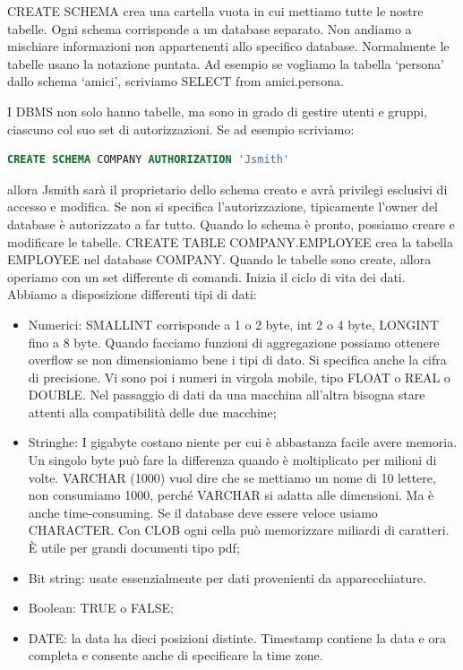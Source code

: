 CREATE SCHEMA crea una cartella vuota in cui mettiamo tutte le nostre tabelle. Ogni schema corrisponde a un database separato. Non andiamo a mischiare informazioni non appartenenti allo specifico database. Normalmente le tabelle usano la notazione puntata. Ad esempio se vogliamo la tabella ‘persona’ dallo schema ‘amici’, scriviamo SELECT from amici.persona.  

I DBMS non solo hanno tabelle, ma sono in grado di gestire utenti e gruppi,  ciascuno col suo set di autorizzazioni. Se ad esempio scriviamo:

\begin{lstlisting}[language=SQL]
CREATE SCHEMA COMPANY AUTHORIZATION 'Jsmith'
\end{lstlisting}

allora Jsmith sarà il proprietario dello schema creato e avrà privilegi esclusivi di accesso e modifica. Se non si specifica l’autorizzazione, tipicamente l’owner del database è autorizzato a far tutto.   
Quando lo schema è pronto, possiamo creare e modificare le tabelle. CREATE TABLE COMPANY.EMPLOYEE crea la tabella EMPLOYEE nel database COMPANY.  Quando le tabelle sono create, allora operiamo con un set differente di comandi. Inizia il ciclo di vita dei dati. Abbiamo a disposizione differenti tipi di dati:

\begin{itemize}

\item{Numerici}: SMALLINT corrisponde a 1 o 2 byte, int 2 o 4 byte, LONGINT fino a 8 byte. Quando facciamo funzioni di aggregazione possiamo ottenere overflow se non dimensioniamo bene i tipi di dato. Si specifica anche la cifra di precisione. Vi sono poi i numeri in virgola mobile,  tipo FLOAT o REAL o DOUBLE. Nel passaggio di dati da una macchina all'altra bisogna stare attenti alla compatibilità delle due macchine;
\item{Stringhe}: I gigabyte costano niente per cui è abbastanza facile avere memoria. Un singolo byte può fare la differenza quando è moltiplicato per milioni di volte. VARCHAR (1000) vuol dire che se mettiamo un nome di 10 lettere, non consumiamo 1000, perché VARCHAR si adatta alle dimensioni. Ma è anche time-consuming. Se il database deve essere veloce usiamo CHARACTER. Con CLOB ogni cella può memorizzare miliardi di caratteri. È utile per grandi documenti tipo pdf;
\item{Bit string}: usate essenzialmente per dati provenienti da apparecchiature.
\item{Boolean}: TRUE o FALSE;
\item{DATE}: la data ha dieci posizioni distinte. Timestamp contiene la data e ora completa e consente anche di specificare la time zone.  

\end{itemize}

